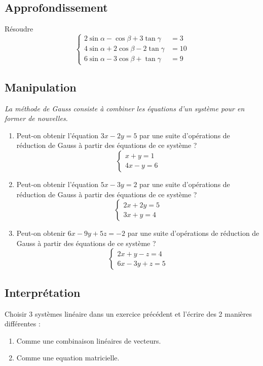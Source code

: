 \subsection{Approfondissement}
Résoudre 
$$\begin{cases}
  2 \sin \alpha-\cos \beta+3 \tan \gamma &= 3 \\
  4 \sin \alpha+2 \cos \beta-2 \tan \gamma &= 10 \\
  6 \sin \alpha-3 \cos \beta+\tan \gamma &= 9
\end{cases}$$

\newpage
\vspace{2em}

\subsection{Manipulation}

\textit{La méthode de Gauss consiste à combiner les équations d'un système pour en former de nouvelles.}

\medskip
\begin{enumerate}[label=\alph*)]
\item Peut-on obtenir l'équation \(3x - 2y = 5\) par une suite d'opérations de réduction de Gauss à partir des équations de ce système ?
\[
\begin{cases}
x + y = 1 \\
4x - y = 6
\end{cases}
\]

\item Peut-on obtenir l'équation \(5x - 3y = 2\) par une suite d'opérations de réduction de Gauss à partir des équations de ce système ?
\[
\begin{cases}
2x + 2y = 5 \\
3x + y = 4
\end{cases}
\]

\item Peut-on obtenir \(6x - 9y + 5z = -2\) par une suite d'opérations de réduction de Gauss à partir des équations de ce système ?
\[
\begin{cases}
2x + y - z = 4 \\
6x - 3y + z = 5
\end{cases}
\]
\end{enumerate}

\vspace{2em}
\subsection{Interprétation}
Choisir 3 systèmes linéaire dans un exercice précédent et l'écrire des 2 manières différentes : 
\begin{enumerate}
\item Comme une combinaison linéaires de vecteurs.
\item Comme une equation matricielle.
\end{enumerate}

